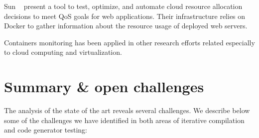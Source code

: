 Sun \etal~\cite{sun2016roar} present a tool to test, optimize, and automate cloud resource allocation decisions to meet QoS goals for web applications. Their infrastructure relies on Docker to gather information about the resource usage of deployed web servers. 

Containers monitoring has been applied in other research efforts related especially to cloud computing and virtualization\cite{peinl2016docker,medel2016modelling}.
\section{Summary \& open challenges}
\label{sec:suumary SOTA}

The analysis of the state of the art reveals several challenges. We describe below some of the challenges we have identified in both areas of iterative compilation and code generator testing:
